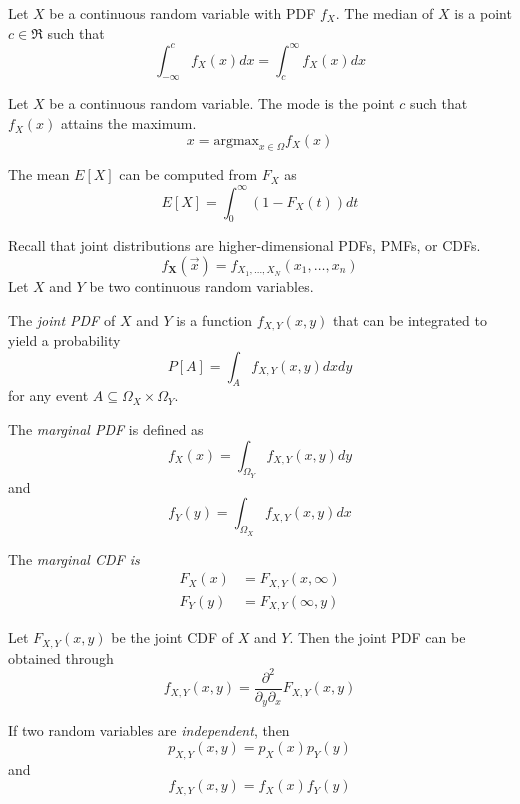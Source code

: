 Let $X$ be a continuous random variable with PDF
$f_X$. The median of $X$ is a point $c \in \Re$ such that
\begin{equation}
    \int_{-\infty}^{c} f_X(x) dx = \int_{c}^{\infty}f_X(x) dx
\end{equation}

Let $X$ be a continuous random variable. The mode is
the point $c$ such that $f_X(x)$ attains the maximum.
\begin{equation}
    x = \text{argmax}_{x \in \Omega} f_X(x)
\end{equation}

The mean $E[X]$ can be computed from
$F_X$ as
\begin{equation}
    E[X] = \int_{0}^{\infty} (1-F_X(t))dt
\end{equation}

Recall that joint distributions are
higher-dimensional PDFs, PMFs, or CDFs.
\begin{equation}
    f_{\textbf{X}}(\vec{x}) = f_{X_1, \dots, X_N}(x_1, \dots, x_n)
\end{equation}
Let $X$ and $Y$ be two continuous random variables.

The \emph{joint PDF} of $X$ and $Y$ is a function
$f_{X,Y}(x,y)$ that can be integrated to yield a probability
\begin{equation}
    P[A] = \int_{A} f_{X,Y}(x,y)dxdy
\end{equation}
for any event $A \subseteq \Omega_X \times \Omega_Y$.

The \emph{marginal PDF} is defined as
\begin{equation}
    f_X(x) = \int_{\Omega_Y} f_{X,Y}(x,y)dy
\end{equation}
and
\begin{equation}
    f_Y(y) = \int_{\Omega_X} f_{X,Y}(x,y)dx
\end{equation}

The \emph{marginal CDF is}
\begin{align}
    F_X(x) & = F_{X,Y}(x, \infty) \\
    F_Y(y) & = F_{X,Y}(\infty, y)
\end{align}

Let $F_{X,Y}(x,y)$ be the joint CDF of $X$ and $Y$.
Then the joint PDF can be obtained through
\begin{equation}
    f_{X,Y}(x,y) = \frac{\partial^2}{\partial_y\partial_x} F_{X,Y}(x,y)
\end{equation}

If two random variables are \emph{independent},
then
\begin{equation}
    p_{X,Y}(x,y) = p_X(x)p_Y(y)
\end{equation}
and
\begin{equation}
    f_{X,Y}(x,y) = f_X(x)f_Y(y)
\end{equation}

